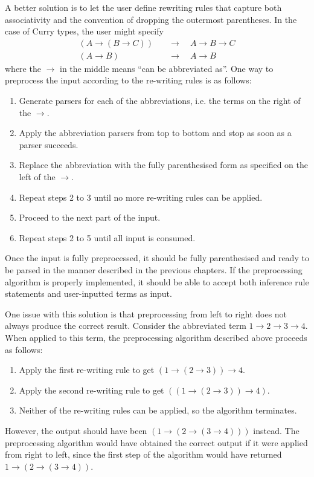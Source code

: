A better solution is to let the user define rewriting rules that capture both associativity and the convention of dropping the outermost parentheses. In the case of Curry types, the user might specify
\begin{align*}
    (A \to (B \to C)) \quad &\to \quad A \to B \to C \\
    (A \to B) \quad &\to \quad A \to B
\end{align*}
where the $\to$ in the middle means ``can be abbreviated as''. One way to preprocess the input according to the re-writing rules is as follows:
\begin{enumerate}
    \item Generate parsers for each of the abbreviations, i.e. the terms on the right of the $\to$.
    \item Apply the abbreviation parsers from top to bottom and stop as soon as a parser succeeds.
    \item Replace the abbreviation with the fully parenthesised form as specified on the left of the $\to$.
    \item Repeat steps 2 to 3 until no more re-writing rules can be applied.
    \item Proceed to the next part of the input.
    \item Repeat steps 2 to 5 until all input is consumed.
\end{enumerate}
Once the input is fully preprocessed, it should be fully parenthesised and ready to be parsed in the manner described in the previous chapters. If the preprocessing algorithm is properly implemented, it should be able to accept both inference rule statements and user-inputted terms as input. 

One issue with this solution is that preprocessing from left to right does not always produce the correct result. Consider the abbreviated term $1 \to 2 \to 3 \to 4$. When applied to this term, the preprocessing algorithm described above proceeds as follows:
\begin{enumerate}
    \item Apply the first re-writing rule to get $(1 \to (2 \to 3)) \to 4$.
    \item Apply the second re-writing rule to get $((1 \to (2 \to 3)) \to 4)$.
    \item Neither of the re-writing rules can be applied, so the algorithm terminates.
\end{enumerate}
However, the output should have been $(1 \to (2 \to (3 \to 4)))$ instead. The preprocessing algorithm would have obtained the correct output if it were applied from right to left, since the first step of the algorithm would have returned $1 \to (2 \to (3 \to 4))$.

